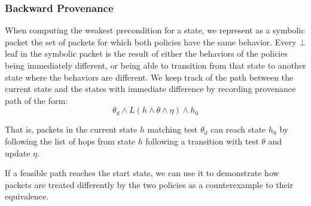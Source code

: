 \documentclass[acmsmall,dvipsnames,nonacm]{acmart}
\begin{document}



\subsubsection{Backward Provenance}

When computing the weakest precondition for a state, we represent as a
symbolic packet the set of packets for which both policies have the
same behavior. Every $\bot$ leaf in the symbolic packet is the result
of either the behaviors of the policies being immediately different,
or being able to transition from that state to another state where the
behaviors are different. We keep track of the path between the current
state and the states with immediate difference by recording provenance
path of the form:
\[
\theta_{d} \wedge \mathit{L} (\mathit{h} \wedge \theta \wedge \eta ) \wedge \mathit{h}_{0}
\]

That is, packets in the current state $\mathit{h}$ matching test
$\theta_{d}$ can reach state $\mathit{h}_{0}$ by following the list of
hops from state $\mathit{h}$ following a transition with test $\theta$
and update $\eta$.
\begin{comment}
When computing the weakest precondition of a state $\mathit{h'}$ with
a transition $\theta'$ and $\eta'$ to $\mathit{h}$, we can use the
paths computed for $\mathit{h}$ as suffixes to construct longer paths
towards the start state. In particular, if the preimage of
$\theta_{d}$ under $\eta'$ results in $\theta'_{d}$, and $\theta'_{d}
\cap \theta' = \theta_{c} \not= \emptyset$, we can construct a new
path from $\mathit{h'}$ to $\mathit{h}_{0}$:
\[
\theta_{c} \wedge (\mathit{h'} \wedge \theta' \wedge \eta') \cdot \mathit{L} (\mathit{h} \wedge \theta \wedge \eta ) \wedge \mathit{h}_{0}
\]
\end{comment}
If a feasible path reaches the start state, we can use it to
demonstrate how packets are treated differently by the two policies as
a counterexample to their equivalence.
\end{document}

